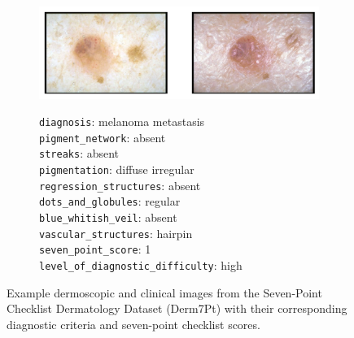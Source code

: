 \documentclass[../ShajiS_RnDReport.tex]{subfiles}
\begin{document}
\begin{figure}[ht]
    \begin{subfigure}[b]{0.8\linewidth}
        \centering
        \includegraphics[width=\linewidth]{figures/derm7pt-images/derm_02.png}
        \vspace{0.25em}
        \raggedright
        \footnotesize\texttt{diagnosis}: melanoma metastasis\\
        \footnotesize\texttt{pigment\_network}: absent\\
        \footnotesize\texttt{streaks}: absent\\
        \footnotesize\texttt{pigmentation}: diffuse irregular\\
        \footnotesize\texttt{regression\_structures}: absent\\
        \footnotesize\texttt{dots\_and\_globules}: regular\\
        \footnotesize\texttt{blue\_whitish\_veil}: absent\\
        \footnotesize\texttt{vascular\_structures}: hairpin\\
        \vspace{0.25em}
        \footnotesize\texttt{seven\_point\_score}: 1\\
        \footnotesize\texttt{level\_of\_diagnostic\_difficulty}: high
        \label{fig:second_image}
    \end{subfigure}

    \caption{Example dermoscopic and clinical images from the Seven-Point Checklist Dermatology Dataset (Derm7Pt) with their corresponding diagnostic criteria and seven-point checklist scores.}
    \label{fig:derm_images}
\end{figure}
\end{document}

